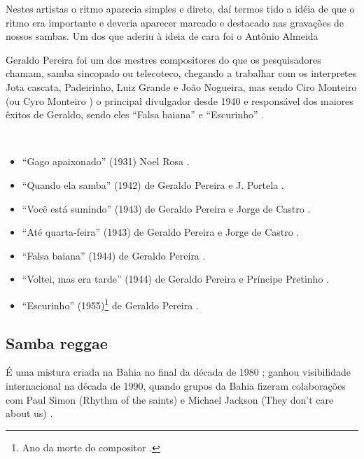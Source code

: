 Nestes artistas o ritmo aparecia simples e direto, daí termos tido a idéia de 
que o ritmo era importante e deveria aparecer marcado e destacado nas gravações 
de nossos sambas. Um dos que aderiu à ideia de cara foi o Antônio Almeida


Geraldo Pereira foi um dos mestres compositores do que os pesquisadores chamam, samba sincopado ou telecoteco,
chegando a trabalhar com os interpretes Jota cascata, Padeirinho, Luiz Grande e João Nogueira,
mas sendo Ciro Monteiro (ou Cyro Monteiro \cite{avelino2018tecituras}) o principal divulgador desde 1940 e
responsável dos maiores êxitos de Geraldo, sendo eles ``Falsa baiana'' e ``Escurinho'' \cite[pp. 68]{diniz2006almanaque}.

\begin{example} ~

\begin{itemize}
\item ``Gago apaixonado'' (1931) Noel Rosa \cite[pp, 990]{marcondes1977enciclopediav2} \cite[pp. 129]{perna2002samba}.
\item ``Quando ela samba'' (1942) de Geraldo Pereira e J. Portela \cite[pp, 1083]{marcondes1977enciclopediav2} \cite[pp. 52]{diniz2006almanaque}.
\item ``Você está sumindo'' (1943) de Geraldo Pereira e Jorge de Castro \cite[pp, 1154]{marcondes1977enciclopediav2} \cite[pp. 52]{diniz2006almanaque}.
\item ``Até quarta-feira'' (1943) de Geraldo Pereira e Jorge de Castro \cite[pp, 909]{marcondes1977enciclopediav2} \cite[pp. 52]{diniz2006almanaque}.
\item ``Falsa baiana'' (1944) de Geraldo Pereira \cite[pp. 107]{de2003tem} \cite[pp. ]{beattie2003human} \cite[pp. 52]{diniz2006almanaque}.
\item ``Voltei, mas era tarde'' (1944) de Geraldo Pereira e Príncipe Pretinho \cite[pp, 1156]{marcondes1977enciclopediav2} \cite[pp. 52]{diniz2006almanaque}.
\item ``Escurinho'' (1955)\footnote{Ano da morte do compositor \cite[pp. 69]{diniz2006almanaque}.} de Geraldo Pereira \cite[pp. 69]{diniz2006almanaque}.

\end{itemize}
\end{example}


\subsection{Samba reggae}
É uma mistura criada na Bahia no final da década de 1980 \cite[pp. 178]{diniz2008almanaque} \cite[pp. 187]{casa1992anales} \cite[pp. 64]{crook2005brazilian};
ganhou visibilidade internacional na década de 1990, 
quando grupos da Bahia fizeram  colaborações com Paul Simon (Rhythm of the saints) e  
Michael Jackson (They don't care about us) 
 \cite[pp. 207]{dunn2014brutality} \cite[pp. 64]{crook2005brazilian}.

